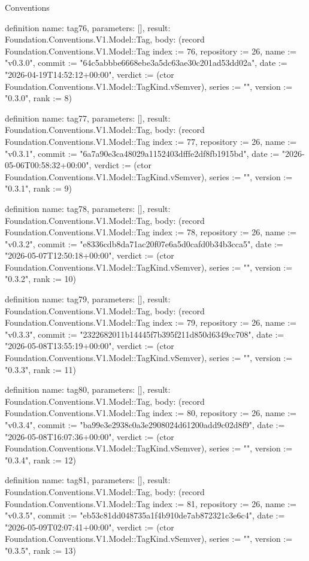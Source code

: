 \begin{lexlean}{Conventions}
\begin{semanticmodule}
definition{
  name: tag76,
  parameters: [],
  result: Foundation.Conventions.V1.Model::Tag,
  body: (record Foundation.Conventions.V1.Model::Tag {index := 76, repository := 26, name := "v0.3.0", commit := "64c5abbbe6668ebe3a5dc63ae30c201ad53dd02a", date := "2026-04-19T14:52:12+00:00", verdict := (ctor Foundation.Conventions.V1.Model::TagKind.vSemver), series := "", version := "0.3.0", rank := 8})
}

definition{
  name: tag77,
  parameters: [],
  result: Foundation.Conventions.V1.Model::Tag,
  body: (record Foundation.Conventions.V1.Model::Tag {index := 77, repository := 26, name := "v0.3.1", commit := "6a7a90e3ca48029a1152403dfffe2df8fb1915bd", date := "2026-05-06T00:58:32+00:00", verdict := (ctor Foundation.Conventions.V1.Model::TagKind.vSemver), series := "", version := "0.3.1", rank := 9})
}

definition{
  name: tag78,
  parameters: [],
  result: Foundation.Conventions.V1.Model::Tag,
  body: (record Foundation.Conventions.V1.Model::Tag {index := 78, repository := 26, name := "v0.3.2", commit := "e8336cdb8da71ac20f07e6a5d0cafd0b34b3cca5", date := "2026-05-07T12:50:18+00:00", verdict := (ctor Foundation.Conventions.V1.Model::TagKind.vSemver), series := "", version := "0.3.2", rank := 10})
}

definition{
  name: tag79,
  parameters: [],
  result: Foundation.Conventions.V1.Model::Tag,
  body: (record Foundation.Conventions.V1.Model::Tag {index := 79, repository := 26, name := "v0.3.3", commit := "2322682011b14445f7b395f211d850d6349cc708", date := "2026-05-08T13:55:19+00:00", verdict := (ctor Foundation.Conventions.V1.Model::TagKind.vSemver), series := "", version := "0.3.3", rank := 11})
}

definition{
  name: tag80,
  parameters: [],
  result: Foundation.Conventions.V1.Model::Tag,
  body: (record Foundation.Conventions.V1.Model::Tag {index := 80, repository := 26, name := "v0.3.4", commit := "ba99e3e2938c0a3e2908024d61200add9c02d8f9", date := "2026-05-08T16:07:36+00:00", verdict := (ctor Foundation.Conventions.V1.Model::TagKind.vSemver), series := "", version := "0.3.4", rank := 12})
}

definition{
  name: tag81,
  parameters: [],
  result: Foundation.Conventions.V1.Model::Tag,
  body: (record Foundation.Conventions.V1.Model::Tag {index := 81, repository := 26, name := "v0.3.5", commit := "eb53c81dd048735a1f4b910de7ab872321c3e6c4", date := "2026-05-09T02:07:41+00:00", verdict := (ctor Foundation.Conventions.V1.Model::TagKind.vSemver), series := "", version := "0.3.5", rank := 13})
}


\end{semanticmodule}
\end{lexlean}
